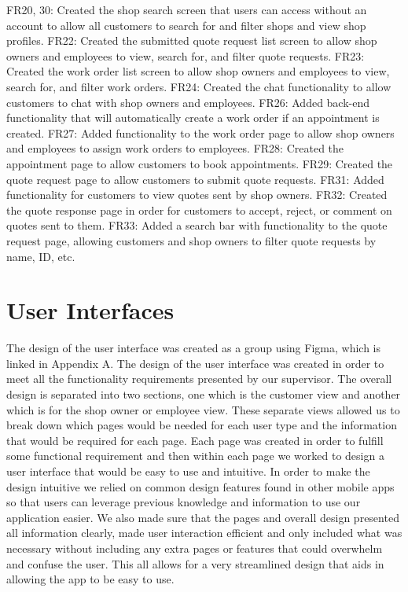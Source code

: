 \documentclass[12pt, titlepage]{article}
\begin{document}
\newline
FR20, 30: Created the shop search screen that users can access without an account to allow all customers to search for and filter shops and view shop profiles.
\newline
FR22: Created the submitted quote request list screen to allow shop owners and employees to view, search for, and filter quote requests.
\newline
FR23: Created the work order list screen to allow shop owners and employees to view, search for, and filter work orders.
\newline
FR24: Created the chat functionality to allow customers to chat with shop owners and employees.
\newline
FR26: Added back-end functionality that will automatically create a work order if an appointment is created.
\newline
FR27: Added functionality to the work order page to allow shop owners and employees to assign work orders to employees.
\newline
FR28: Created the appointment page to allow customers to book appointments.
\newline
FR29: Created the quote request page to allow customers to submit quote requests.
\newline
FR31: Added functionality for customers to view quotes sent by shop owners.
\newline
FR32: Created the quote response page in order for customers to accept, reject, or comment on quotes sent to them.
\newline
FR33: Added a search bar with functionality to the quote request page, allowing customers and shop owners to filter quote requests by name, ID, etc.

\section{User Interfaces}

\noindent
The design of the user interface was created as a group using Figma, which is linked in Appendix A. The design of the user interface was created in order to meet all the functionality requirements presented by our supervisor. The overall design is separated into two sections, one which is the customer view and another which is for the shop owner or employee view. These separate views allowed us to break down which pages would be needed for each user type and the information that would be required for each page. Each page was created in order to fulfill some functional requirement and then within each page we worked to design a user interface that would be easy to use and intuitive. In order to make the design intuitive we relied on common design features found in other mobile apps so that users can leverage previous knowledge and information to use our application easier. We also made sure that the pages and overall design presented all information clearly, made user interaction efficient and only included what was necessary without including any extra pages or features that could overwhelm and confuse the user. This all allows for a very streamlined design that aids in allowing the app to be easy to use.
\end{document}
